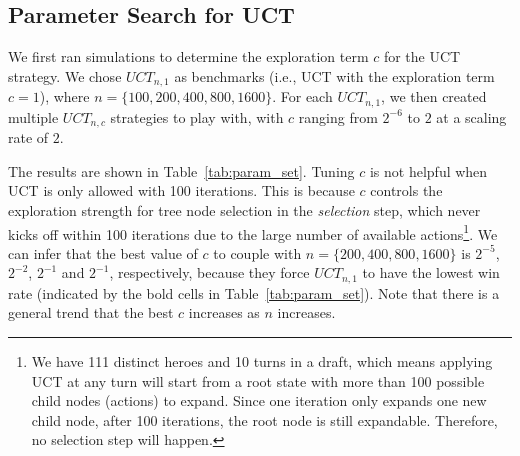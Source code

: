 \subsection{Parameter Search for UCT}

We first ran simulations to determine the exploration term $c$ for the UCT strategy. We chose $UCT_{n, 1}$ as benchmarks (i.e., UCT with the exploration term ${c=1}$), where ${n=\{100, 200, 400, 800, 1600\}}$. For each $UCT_{n,1}$, we then created multiple $UCT_{n, c}$ strategies to play with, with $c$ ranging from $2^{-6}$ to $2$ at a scaling rate of $2$.

The results are shown in Table~\ref{tab:param_set}. Tuning $c$ is not helpful when UCT is only allowed with 100 iterations. This is because $c$ controls the exploration strength for tree node selection in the \textit{selection} step, which never kicks off within 100 iterations due to the large number of available actions\footnote{We have 111 distinct heroes and 10 turns in a draft, which means applying UCT at any turn will start from a root state with more than 100 possible child nodes (actions) to expand. Since one iteration only expands one new child node, after 100 iterations, the root node is still expandable. Therefore, no selection step will happen. }. We can infer that the best value of $c$ to couple with ${n=\{200, 400, 800, 1600\}}$ is $2^{-5}$, $2^{-2}$, $2^{-1}$ and $2^{-1}$, respectively, because they force $UCT_{n, 1}$ to have the lowest win rate (indicated by the bold cells in Table~\ref{tab:param_set}). Note that there is a general trend that the best $c$ increases as $n$ increases.



